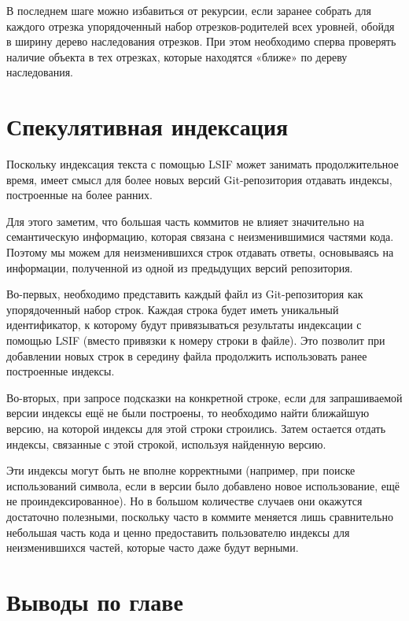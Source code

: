 В последнем шаге можно избавиться от рекурсии, если заранее собрать для каждого отрезка упорядоченный набор отрезков-родителей всех уровней, обойдя в ширину дерево наследования отрезков. При этом необходимо сперва проверять наличие объекта в тех отрезках, которые находятся «ближе» по дереву наследования.

\section{Спекулятивная индексация}

Поскольку индексация текста с помощью \gls{LSIF} может занимать продолжительное время, имеет смысл для более новых версий Git-репозитория отдавать индексы, построенные на более ранних.

Для этого заметим, что большая часть коммитов не влияет значительно на семантическую информацию, которая связана с неизменившимися частями кода. Поэтому мы можем для неизменившихся строк отдавать ответы, основываясь на информации, полученной из одной из предыдущих версий репозитория.

Во-первых, необходимо представить каждый файл из Git-репозитория как упорядоченный набор строк. Каждая строка будет иметь уникальный идентификатор, к которому будут привязываться результаты индексации с помощью \gls{LSIF} (вместо привязки к номеру строки в файле). Это позволит при добавлении новых строк в середину файла продолжить использовать ранее построенные индексы.

Во-вторых, при запросе подсказки на конкретной строке, если для запрашиваемой версии индексы ещё не были построены, то необходимо найти ближайшую версию, на которой индексы для этой строки строились. Затем остается отдать индексы, связанные с этой строкой, используя найденную версию.

Эти индексы могут быть не вполне корректными (например, при поиске использований символа, если в версии было добавлено новое использование, ещё не проиндексированное). Но в большом количестве случаев они окажутся достаточно полезными, поскольку часто в коммите меняется лишь сравнительно небольшая часть кода и ценно предоставить пользователю индексы для неизменившихся частей, которые часто даже будут верными.

\section{Выводы по главе}

